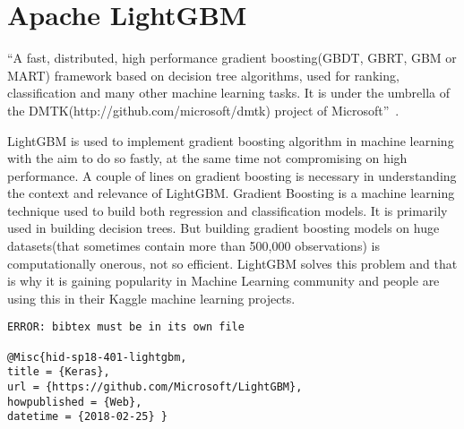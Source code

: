 \section{Apache LightGBM} 

``A fast, distributed, high performance gradient boosting(GBDT, GBRT, GBM or
MART) framework based on decision tree algorithms, used for ranking,
classification and many other machine learning tasks. It is under the
umbrella of the DMTK(http://github.com/microsoft/dmtk) project of
Microsoft''~\cite{hid-sp18-401-lightgbm}. 

LightGBM is used to implement gradient boosting algorithm in
machine learning with the aim to do so fastly, at the same time not compromising
on high performance.  A couple of lines on gradient boosting is necessary in
understanding the context and relevance of LightGBM. Gradient Boosting is a
machine learning technique used to build both regression and classification
models. It is primarily used in building decision trees. But building gradient
boosting models on huge datasets(that sometimes contain more than 500,000
observations) is computationally onerous, not so efficient.  LightGBM solves
this problem and that is why it is gaining popularity in Machine Learning
community and people are using this in their Kaggle machine learning projects.

\begin{verbatim}
ERROR: bibtex must be in its own file

@Misc{hid-sp18-401-lightgbm, 
title = {Keras}, 
url = {https://github.com/Microsoft/LightGBM}, 
howpublished = {Web}, 
datetime = {2018-02-25} }
\end{verbatim}

